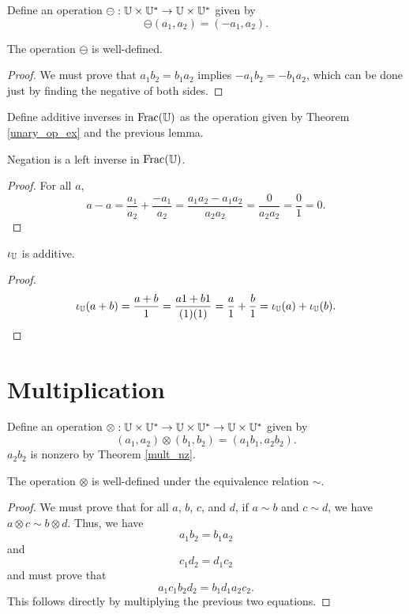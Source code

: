 \documentclass[../../math.tex]{subfiles}
\begin{document}
\begin{definition}
    Define an operation $\ominus : \mathbb{U} \times \mathbb{U}^* \to \mathbb{U} \times \mathbb{U}^*$ given by
    \[
        \ominus (a_1, a_2) = (-a_1, a_2).
    \]
\end{definition}

\begin{lemma}
    The operation $\ominus$ is well-defined.
\end{lemma}
\begin{proof}
    We must prove that $a_1b_2 = b_1a_2$ implies $-a_1b_2 = -b_1a_2$, which can
    be done just by finding the negative of both sides.
\end{proof}

\begin{instance}
    Define additive inverses in $\operatorname{Frac}(\mathbb{U})$ as the operation given by Theorem
    \ref{unary_op_ex} and the previous lemma.
\end{instance}

\begin{instance}
    Negation is a left inverse in $\operatorname{Frac}(\mathbb{U})$.
\end{instance}
\begin{proof}
    For all $a$,
    \[
        a - a =
        \frac{a_1}{a_2} + \frac{-a_1}{a_2} =
        \frac{a_1a_2 - a_1a_2}{a_2a_2} =
        \frac{0}{a_2a_2} =
        \frac{0}{1} =
        0.
    \]
\end{proof}

\begin{instance}
    $\iota_{\mathbb{U}}$ is additive.
\end{instance}
\begin{proof}
    \[
        \iota_{\mathbb{U}}(a + b) =
        \frac{a + b}{1} =
        \frac{a1 + b1}{(1)(1)} =
        \frac{a}{1} + \frac{b}{1} =
        \iota_{\mathbb{U}}(a) + \iota_{\mathbb{U}}(b).
    \]
\end{proof}

\section{Multiplication}

\begin{definition}
    Define an operation $\otimes : \mathbb{U} \times \mathbb{U}^* \to \mathbb{U} \times \mathbb{U}^* \to \mathbb{U}
    \times \mathbb{U}^*$ given by
    \[
        (a_1, a_2) \otimes (b_1, b_2) = (a_1b_1, a_2b_2).
    \]
    $a_2b_2$ is nonzero by Theorem \ref{mult_nz}.
\end{definition}

\begin{lemma}
    The operation $\otimes$ is well-defined under the equivalence relation
    $\sim$.
\end{lemma}
\begin{proof}
    We must prove that for all $a$, $b$, $c$, and $d$, if $a \sim b$ and $c \sim
    d$, we have $a \otimes c \sim b \otimes d$.  Thus, we have
    \[
        a_1b_2 = b_1a_2
    \]
    and
    \[
        c_1d_2 = d_1c_2
    \]
    and must prove that
    \[
        a_1c_1b_2d_2 = b_1d_1a_2c_2.
    \]
    This follows directly by multiplying the previous two equations.
\end{proof}
\end{document}
